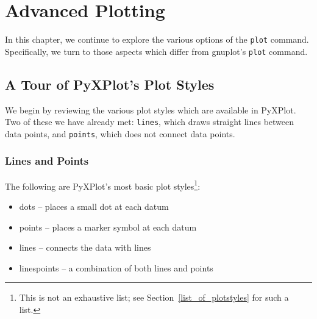 %
%
%
%
%



\chapter{Advanced Plotting}

In this chapter, we continue to explore the various options of the {\tt plot}
command. Specifically, we turn to those aspects which differ from gnuplot's
{\tt plot} command.

\section{A Tour of PyXPlot's Plot Styles}

We begin by reviewing the various plot styles which are available in PyXPlot.
Two of these we have already met: {\tt lines}, which draws straight lines
between data points, and {\tt points}, which does not connect data points.

\subsection{Lines and Points}

The following are PyXPlot's most basic plot styles\footnote{This is not an
exhaustive list; see Section~\ref{list_of_plotstyles} for such a list.}:
\begin{itemize}
\item dots -- places a small dot at each datum
\item points -- places a marker symbol at each datum
\item lines -- connects the data with lines
\item linespoints -- a combination of both lines and points
\end{itemize}

